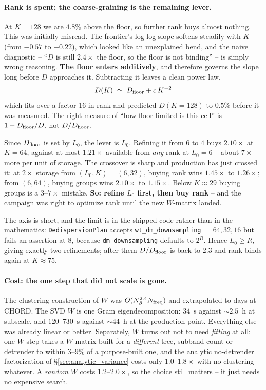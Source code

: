 \documentclass{article}
\numberwithin{equation}{section}   %
\begin{document}
\paragraph{Rank is spent; the coarse-graining is the remaining lever.}
At $K = 128$ we are $4.8\%$ above the floor, so further rank buys almost nothing. This was
initially misread. The frontier's log-log slope softens steadily with $K$ (from $-0.57$ to
$-0.22$), which looked like an unexplained bend, and the naive diagnostic -- ``$D$ is still
$2.4\times$ the floor, so the floor is not binding'' -- is simply wrong reasoning. {\bf The floor
enters additively}, and therefore governs the slope long before $D$ approaches it. Subtracting it
leaves a clean power law,
\begin{equation}
D(K) \;\simeq\; D_{\rm floor} + c\,K^{-2}
\label{eq:varmap_c2_powerlaw}
\end{equation}
which fits over a factor 16 in rank and predicted $D(K{=}128)$ to $0.5\%$ before it was measured.
The right measure of ``how floor-limited is this cell'' is $1 - D_{\rm floor}/D$, not
$D/D_{\rm floor}$.

Since $D_{\rm floor}$ is set by $L_0$, the lever is $L_0$. Refining it from $6$ to $4$ buys
$2.10\times$ at $K = 64$, against at most $1.21\times$ available from {\em any} rank at $L_0 = 6$
-- about $7\times$ more per unit of storage. The crossover is sharp and production has just
crossed it: at $2\times$ storage from $(L_0, K) = (6, 32)$, buying rank wins $1.45\times$ to
$1.26\times$; from $(6, 64)$, buying groups wins $2.10\times$ to $1.15\times$. Below
$K \approx 29$ buying groups is a $3$--$7\times$ mistake. {\bf So: refine $L_0$ first, then buy
rank} -- and the campaign was right to optimize rank until the new $W$-matrix landed.

The axis is short, and the limit is in the shipped code rather than in the mathematics:
{\tt DedispersionPlan} accepts {\tt wt\_dm\_downsampling} $= 64, 32, 16$ but fails an assertion at
$8$, because {\tt dm\_downsampling} defaults to $2^R$. Hence $L_0 \ge R$, giving exactly two
refinements; after them $D/D_{\rm floor}$ is back to $2.3$ and rank binds again at $K \approx 75$.

\paragraph{Cost: the one step that did not scale is gone.}
The clustering construction of $W$ was $O(N_\beta^{2.4} N_{\rm freq})$ and extrapolated to days at
CHORD. The SVD $W$ is one Gram eigendecomposition: $34$~s against $\sim 2.5$~h at subscale, and
$120$--$730$~s against $\sim 44$~h at the production point. Everything else was already linear or
better. Separately, $W$ turns out not to need {\em fitting} at all: one $W$-step takes
a $W$-matrix built for a {\em different} tree, subband count or detrender to within $3$--$9\%$ of
a purpose-built one, and the analytic no-detrender factorization of \S\ref{sec:analytic_variance}
costs only $1.0$--$1.8\times$ with no clustering whatever. A {\em random} $W$ costs
$1.2$--$2.0\times$, so the choice still matters -- it just needs no expensive search.
\end{document}
